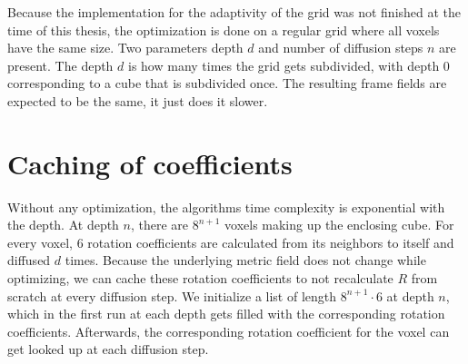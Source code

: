 \documentclass[../thesis.tex]{subfiles}
\begin{document}
Because the implementation for the adaptivity of the grid was not finished
at the time of this thesis, the optimization is done on a regular grid where
all voxels have the same size. Two parameters depth $d$ and number of diffusion steps $n$
are present. The depth $d$ is how many times the grid gets subdivided, with depth $0$
corresponding to a cube that is subdivided once.
The resulting frame fields are expected to be the same, it just does it slower.

\section{Caching of coefficients}
Without any optimization, the algorithms time complexity is exponential with the depth.
At depth $n$, there are $8^{n+1}$ voxels making up the enclosing cube.
For every voxel, 6 rotation coefficients are calculated from its neighbors to itself
and diffused $d$ times.
Because the underlying metric field does not change while optimizing,
we can cache these rotation coefficients to not recalculate $R$ from scratch at every diffusion step.
We initialize a list of length $8^{n+1}\cdot 6$ at depth $n$, which in the first run at each depth
gets filled with the corresponding rotation coefficients.
Afterwards, the corresponding rotation coefficient for the voxel can get
looked up at each diffusion step.
\end{document}
